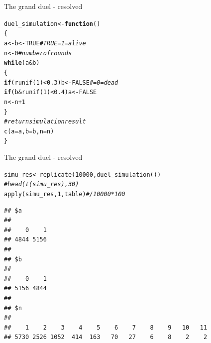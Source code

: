 \documentclass[xcolor=table,       handout,    xcolor=dvipsnames]{beamer}\usepackage[]{graphicx}\usepackage[]{color}
\makeatletter
\newcommand{\hlnum}[1]{\textcolor[rgb]{0,0,0}{#1}}
\newcommand{\hlcom}[1]{\textcolor[rgb]{0,0.392,0}{\textit{#1}}}
\newcommand{\hlopt}[1]{\textcolor[rgb]{0,0,0}{#1}}
\newcommand{\hlstd}[1]{\textcolor[rgb]{0,0,0}{#1}}
\newcommand{\hlkwa}[1]{\textcolor[rgb]{1,0,0}{\textbf{#1}}}
\newcommand{\hlkwb}[1]{\textcolor[rgb]{0,0,0}{#1}}
\newcommand{\hlkwc}[1]{\textcolor[rgb]{1,0,1}{#1}}
\newcommand{\hlkwd}[1]{\textcolor[rgb]{0,0,1}{#1}}
\newenvironment{kframe}{%
 \def\at@end@of@kframe{}%
 \ifinner\ifhmode%
  \def\at@end@of@kframe{\end{minipage}}%
  \begin{minipage}{\columnwidth}%
 \fi\fi%
 \def\FrameCommand##1{\hskip\@totalleftmargin \hskip-\fboxsep
 \colorbox{shadecolor}{##1}\hskip-\fboxsep
     \hskip-\linewidth \hskip-\@totalleftmargin \hskip\columnwidth}%
 \MakeFramed {\advance\hsize-\width
   \@totalleftmargin\z@ \linewidth\hsize
   \@setminipage}}%
 {\par\unskip\endMakeFramed%
 \at@end@of@kframe}
\newenvironment{knitrout}{}{} %
\makeatother
\begin{document}

\begin{frame}[fragile]{The grand duel - resolved}
\begin{knitrout}
\color{fgcolor}\begin{kframe}
\begin{alltt}
\hlstd{duel_simulation} \hlkwb{<-} \hlkwa{function}\hlstd{()}
\hlstd{\{}
\hlstd{a} \hlkwb{<-} \hlstd{b} \hlkwb{<-} \hlnum{TRUE} \hlcom{# TRUE = 1 = alive}
\hlstd{n} \hlkwb{<-} \hlnum{0} \hlcom{# number of rounds}
\hlkwa{while}\hlstd{(a}\hlopt{&}\hlstd{b)}
  \hlstd{\{}
  \hlkwa{if}\hlstd{(}  \hlkwd{runif}\hlstd{(}\hlnum{1}\hlstd{)}\hlopt{<}\hlnum{0.3}\hlstd{) b} \hlkwb{<-} \hlnum{FALSE} \hlcom{# = 0 = dead}
  \hlkwa{if}\hlstd{(b}\hlopt{&}\hlkwd{runif}\hlstd{(}\hlnum{1}\hlstd{)}\hlopt{<}\hlnum{0.4}\hlstd{) a} \hlkwb{<-} \hlnum{FALSE}
  \hlstd{n} \hlkwb{<-} \hlstd{n}\hlopt{+}\hlnum{1}
  \hlstd{\}}
\hlcom{# return simulation result}
\hlkwd{c}\hlstd{(}\hlkwc{a}\hlstd{=a,}\hlkwc{b}\hlstd{=b,} \hlkwc{n}\hlstd{=n)}
\hlstd{\}}
\end{alltt}
\end{kframe}
\end{knitrout}
\end{frame}


\begin{frame}[fragile]{The grand duel - resolved}
\vspace{-1em}
\begin{knitrout}\small
{}\color{fgcolor}\begin{kframe}
\begin{alltt}
\hlstd{simu_res} \hlkwb{<-} \hlkwd{replicate}\hlstd{(}\hlnum{10000}\hlstd{,} \hlkwd{duel_simulation}\hlstd{())}
\hlcom{# head(t(simu_res), 30)}
\hlkwd{apply}\hlstd{(simu_res,} \hlnum{1}\hlstd{, table)} \hlcom{# / 10000 *100}
\end{alltt}
\begin{verbatim}
## $a
## 
##    0    1 
## 4844 5156 
## 
## $b
## 
##    0    1 
## 5156 4844 
## 
## $n
## 
##    1    2    3    4    5    6    7    8    9   10   11 
## 5730 2526 1052  414  163   70   27    6    8    2    2
\end{verbatim}
\end{kframe}
\end{knitrout}
\end{frame}
\end{document}
